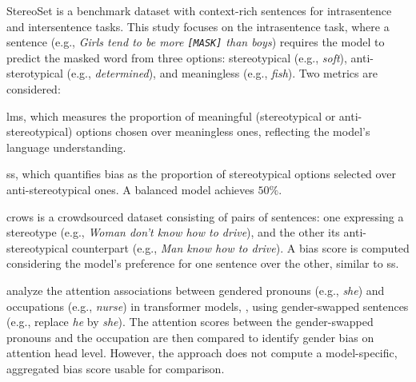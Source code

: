 StereoSet \cite{stereoset} is a benchmark dataset with context-rich sentences for intrasentence and intersentence tasks.
This study focuses on the intrasentence task, where a sentence (e.g., \emph{Girls tend to be more \texttt{[MASK]} than boys}) requires the model to predict the masked word from three options: stereotypical (e.g., \emph{soft}), anti-sterotypical (e.g., \emph{determined}), and meaningless (e.g., \emph{fish}).
Two metrics are considered: 
\begin{enumerate*}[label=\textbf{\arabic*)}] 
\item \gls{lms}, which measures the proportion of meaningful (stereotypical or anti-stereotypical) options chosen over meaningless ones, reflecting the model’s language understanding. 
\item \gls{ss}, which quantifies bias as the proportion of stereotypical options selected over anti-stereotypical ones. A balanced model achieves $50\%$. \end{enumerate*}


\gls{crows} \cite{crows} is a crowdsourced dataset consisting of pairs of sentences: one expressing a stereotype (e.g., \emph{Woman don't know how to drive}), and the other its anti-stereotypical counterpart (e.g., \emph{Man know how to drive}). A bias score is computed considering the model's preference for one sentence over the other, similar to \gls{ss}. 


\citet{li2021detectinggenderbiastransformerbased} analyze the attention associations between gendered pronouns (e.g., \emph{she}) and occupations (e.g., \emph{nurse}) in transformer models, , using gender-swapped sentences (e.g., replace \emph{he} by \emph{she}). The attention scores between the gender-swapped pronouns and the occupation are then compared to identify gender bias on attention head level. However, the approach does not compute a model-specific, aggregated bias score usable for comparison.